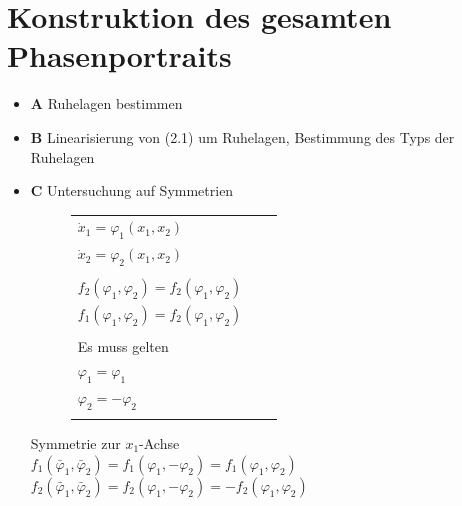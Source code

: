 \documentclass[ngerman]{tudscrreprt}
\begin{document}
\section{Konstruktion des gesamten Phasenportraits}
\begin{itemize}
\item{\textbf{A}} Ruhelagen bestimmen
\item{\textbf{B}} Linearisierung von (2.1) um Ruhelagen, Bestimmung des Typs der Ruhelagen
\item{\textbf{C}} Untersuchung auf Symmetrien
\begin{figure}[htbp]
\begin{minipage}[c]{8.0cm}
\def\svgwidth{150pt} 
 
\end{minipage}
\begin{minipage}[c]{7cm}

\begin{tabular}{lll}
$\dot x_1 = \varphi_1(x_1, x_2)$ &&\\
$\dot x_2 = \varphi_2(x_1, x_2)$ &&\\
&&\\
$f_2(\varphi_1, \varphi_2)=f_2(\varphi_1,\varphi_2)$ &&\\
$f_1(\varphi_1, \varphi_2)=f_2(\varphi_1,\varphi_2)$ &&\\
&&\\
Es muss gelten &&\\
$\varphi_1 = \varphi_1$ &&\\
$\varphi_2 = -\varphi_2$ &&\\
&&\\
\end{tabular}
\end{minipage}
\end{figure} 
Symmetrie zur $x_1$-Achse\\
$f_1(\bar \varphi_1, \bar \varphi_2)=f_1(\varphi_1,-\varphi_2)= f_1(\varphi_1,\varphi_2)$\\
$f_2(\bar \varphi_1, \bar \varphi_2)=f_2(\varphi_1,-\varphi_2)= -f_2(\varphi_1,\varphi_2)$\\


\end{itemize}
\end{document}
